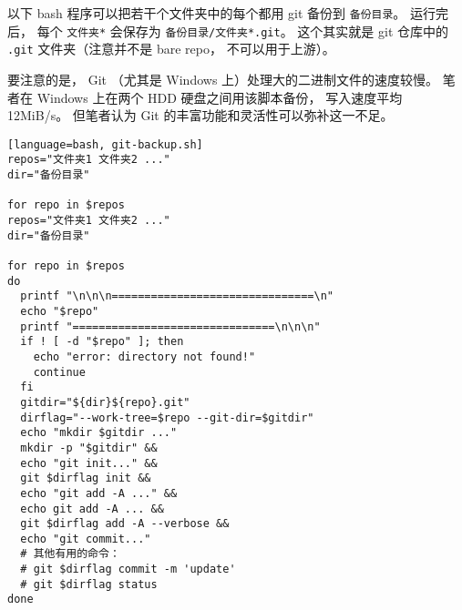 
\begin{issues}
\issueDraft
\end{issues}


以下 bash 程序可以把若干个文件夹中的每个都用 git 备份到 \verb|备份目录|。 运行完后， 每个 \verb|文件夹*| 会保存为 \verb|备份目录/文件夹*.git|。 这个其实就是 git 仓库中的 \verb|.git| 文件夹（注意并不是 bare repo， 不可以用于上游）。

要注意的是， Git （尤其是 Windows 上）处理大的二进制文件的速度较慢。 笔者在 Windows 上在两个 HDD 硬盘之间用该脚本备份， 写入速度平均 12MiB/s。 但笔者认为 Git 的丰富功能和灵活性可以弥补这一不足。

\begin{lstlisting}[language=bash, git-backup.sh]
repos="文件夹1 文件夹2 ..."
dir="备份目录"

for repo in $repos
repos="文件夹1 文件夹2 ..."
dir="备份目录"

for repo in $repos
do
  printf "\n\n\n===============================\n"
  echo "$repo"
  printf "===============================\n\n\n"
  if ! [ -d "$repo" ]; then
    echo "error: directory not found!"
    continue
  fi
  gitdir="${dir}${repo}.git"
  dirflag="--work-tree=$repo --git-dir=$gitdir"
  echo "mkdir $gitdir ..."
  mkdir -p "$gitdir" &&
  echo "git init..." &&
  git $dirflag init &&
  echo "git add -A ..." &&
  echo git add -A ... &&
  git $dirflag add -A --verbose &&
  echo "git commit..."
  # 其他有用的命令：
  # git $dirflag commit -m 'update'
  # git $dirflag status
done
\end{lstlisting}
